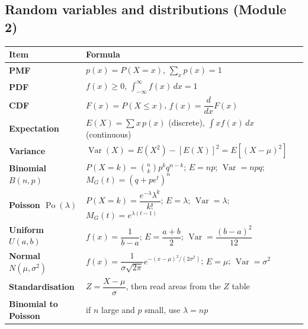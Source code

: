 \documentclass[11pt,a4paper]{article}
\begin{document}
\subsection{Random variables and distributions (Module 2)}
\begin{center}\small
\begin{tabularx}{\textwidth}{>{\bfseries}p{} X}
\toprule Item & Formula\\\midrule
PMF & $p(x)=P(X=x)$, $\sum_x p(x)=1$\\
PDF & $f(x)\ge 0$, $\int_{-\infty}^{\infty} f(x)\,dx=1$\\
CDF & $F(x)=P(X\le x)$, $f(x)=\dfrac{d}{dx}F(x)$\\
Expectation & $E(X)=\sum x\,p(x)$ (discrete), $\int x f(x)\,dx$ (continuous)\\
Variance & $\operatorname{Var}(X)=E(X^2)-[E(X)]^2=E[(X-\mu)^2]$\\
Binomial $B(n,p)$ & $P(X=k)=\binom nk p^k q^{n-k}$; $E=np$; $\operatorname{Var}=npq$; $M_G(t)=(q+pe^t)^n$\\
Poisson $\operatorname{Po}(\lambda)$ & $P(X=k)=\dfrac{e^{-\lambda}\lambda^k}{k!}$; $E=\lambda$; $\operatorname{Var}=\lambda$; $M_G(t)=e^{\lambda(t-1)}$\\
Uniform $U(a,b)$ & $f(x)=\dfrac{1}{b-a}$; $E=\dfrac{a+b}{2}$; $\operatorname{Var}=\dfrac{(b-a)^2}{12}$\\
Normal $N(\mu,\sigma^2)$ & $f(x)=\dfrac{1}{\sigma\sqrt{2\pi}}e^{-(x-\mu)^2/(2\sigma^2)}$; $E=\mu$; $\operatorname{Var}=\sigma^2$\\
Standardisation & $Z=\dfrac{X-\mu}{\sigma}$, then read areas from the $Z$ table\\
Binomial to Poisson & if $n$ large and $p$ small, use $\lambda=np$\\\bottomrule
\end{tabularx}
\end{center}
\end{document}
